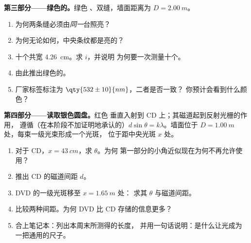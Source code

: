 \begin{problem}
\medskip
\noindent\textbf{第三部分——绿色的。}绿色
、双缝，墙面距离为 $D = \qty{2.00}{m}$。
\begin{enumerate}[resume]
  \item 为何两条缝必须由\emph{同一}台照亮？
  \item 为何无论如何，中央条纹都是亮的？
  \item 十个共宽 \qty{4.26}{cm}。求 $i$，并说明
        为何要一次测量十个。
  \item 由此推出绿色的。
  \item 厂家标签标注为 $\qty{532 \pm 10}{nm}$，二者是否一致？
        你预计会看到什么颜色？
\end{enumerate}

\medskip
\noindent\textbf{第四部分——读取银色圆盘。}红色
垂直入射到 CD 上；其磁道起到反射光栅的作用，
遵循（在本阶段不加证明地承认的）$d \sin\theta = k\lambda$。墙面位于 $D =
\qty{1.00}{m}$ 处，每束一级光束形成一个光斑，
位于距中央光斑 $x$ 处。
\begin{enumerate}[resume]
  \item 对于 CD，$x = \qty{43}{cm}$，求 $\theta$。为何
        第一部分的小角近似现在为何不再允许使用？
  \item 推出 CD 的磁道间距 $d$。
  \item DVD 的一级光斑移至 $x = \qty{1.65}{m}$ 处：
        求其 $\theta$ 与磁道间距。
  \item 比较两种间距。为何 DVD 比 CD 存储的信息更多？
  \item 合上笔记本：列出本周末所测得的长度，
        并用一句话说明：是什么让光成为一把通用的尺子。
\end{enumerate}
\end{problem}
